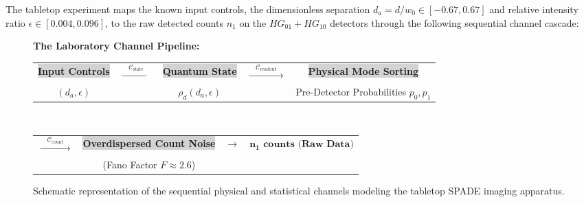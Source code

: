 The tabletop experiment maps the known input controls, the dimensionless separation $d_a = d/w_0 \in [-0.67, 0.67]$ and relative intensity ratio $\epsilon \in [0.004, 0.096]$, to the raw detected counts $n_1$ on the $HG_{01} + HG_{10}$ detectors through the following sequential channel cascade:

\begin{figure}[H]
    \centering
    \begin{center}
        \textbf{The Laboratory Channel Pipeline:} \\
        \begin{tabular}{ccccc}
            \colorbox{lightgray}{\textbf{Input Controls}} & $\xrightarrow{\quad\mathcal{C}_{\text{state}}\quad}$ & \colorbox{lightgray}{\textbf{Quantum State}} & $\xrightarrow{\quad\mathcal{C}_{\text{readout}}\quad}$ & \colorbox{lightgray}{\textbf{Physical Mode Sorting}} \\
            $(d_a, \epsilon)$                             &                                                      & $\rho_d(d_a, \epsilon)$                      &                                                        & Pre-Detector Probabilities $p_0, p_1$                \\
        \end{tabular}
        \\[0.3cm]
        \begin{tabular}{ccc}
            $\xrightarrow{\quad\mathcal{C}_{\text{count}}\quad}$ & \colorbox{lightgray}{\textbf{Overdispersed Count Noise}} & $\longrightarrow \quad \mathbf{n_1 \text{ counts (Raw Data)}}$ \\
                                                                 & (Fano Factor $F \approx 2.6$)                            &                                                                \\
        \end{tabular}
    \end{center}
    \caption{Schematic representation of the sequential physical and statistical channels modeling the tabletop SPADE imaging apparatus.}
    \label{fig:sequential_channel_pipeline}
\end{figure}

